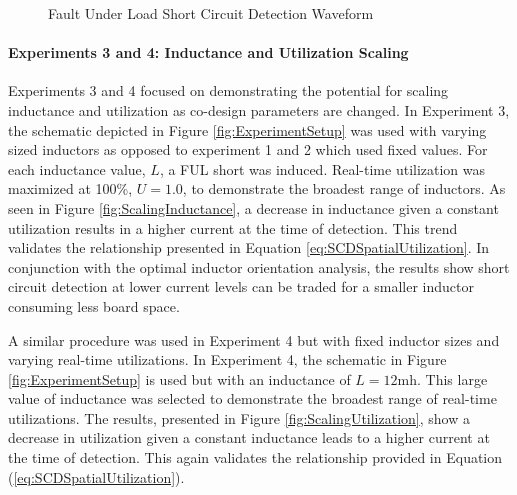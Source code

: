 \begin{figure}
    \centering
    \caption{Fault Under Load Short Circuit Detection Waveform}
    \label{fig:FULShort}
\end{figure}

\paragraph{Experiments 3 and 4: Inductance and Utilization Scaling}
Experiments 3 and 4 focused on demonstrating the potential for scaling inductance and utilization as co-design parameters are changed.
In Experiment 3, the schematic depicted in Figure \ref{fig:ExperimentSetup} was used with varying sized inductors as opposed to experiment 1 and 2 which used fixed values.
For each inductance value, $L$, a FUL short was induced.
Real-time utilization was maximized at 100\%, $U = 1.0$, to demonstrate the broadest range of inductors.
As seen in Figure \ref{fig:ScalingInductance}, a decrease in inductance given a constant utilization results in a higher current at the time of detection.
This trend validates the relationship presented in Equation \ref{eq:SCDSpatialUtilization}.
In conjunction with the optimal inductor orientation analysis, the results show short circuit detection at lower current levels can be traded for a smaller inductor consuming less board space.

A similar procedure was used in Experiment 4 but with fixed inductor sizes and varying real-time utilizations.
In Experiment 4, the schematic in Figure \ref{fig:ExperimentSetup} is used but with an inductance of $L = 12 \text{mh}$.
 This large value of inductance was selected to demonstrate the broadest range of real-time utilizations.
The results, presented in Figure \ref{fig:ScalingUtilization}, show a decrease in utilization given a constant inductance leads to a higher current at the time of detection.
This again validates the relationship provided in Equation (\ref{eq:SCDSpatialUtilization}).

